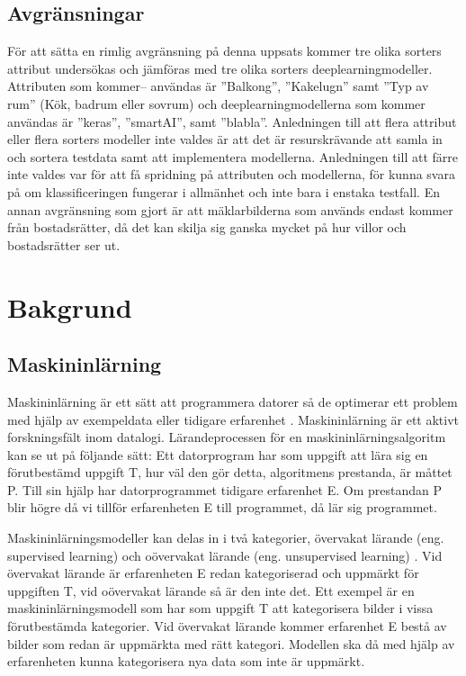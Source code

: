 \documentclass[]{kththesis}
\begin{document}
\section{Avgränsningar}
För att sätta en rimlig avgränsning på denna uppsats kommer tre olika sorters attribut undersökas och jämföras med tre olika sorters deeplearningmodeller. 
Attributen som kommer– användas är ”Balkong”, ”Kakelugn” samt ”Typ av rum” (Kök, badrum eller sovrum) och deeplearningmodellerna som kommer användas är ”keras”, ”smartAI”, samt ”blabla”. 
Anledningen till att flera attribut eller flera sorters modeller inte valdes är att det är resurskrävande att samla in och sortera testdata samt att implementera modellerna. 
Anledningen till att färre inte valdes var för att få spridning på attributen och modellerna, för kunna svara på om klassificeringen fungerar i allmänhet och inte bara i enstaka testfall. 
En annan avgränsning som gjort är att mäklarbilderna som används endast kommer från bostadsrätter, då det kan skilja sig ganska mycket på hur villor och bostadsrätter ser ut.

\chapter{Bakgrund}

\section{Maskininlärning}
Maskininlärning är ett sätt att programmera datorer så de optimerar ett problem med hjälp av exempeldata eller tidigare erfarenhet \parencite{alpaydin2009introduction}. Maskininlärning är ett aktivt forskningsfält inom datalogi. Lärandeprocessen för en maskininlärningsalgoritm kan se ut på följande sätt: Ett datorprogram har som uppgift att lära sig en förutbestämd uppgift T, hur väl den gör detta, algoritmens prestanda, är måttet P. Till sin hjälp har datorprogrammet tidigare erfarenhet E. Om prestandan P blir högre då vi tillför erfarenheten E till programmet, då lär sig programmet.

Maskininlärningsmodeller kan delas in i två kategorier, övervakat lärande (eng. supervised learning) och oövervakat lärande (eng. unsupervised learning) \parencite{murphy2012machine}. Vid övervakat lärande är erfarenheten E redan kategoriserad och uppmärkt för uppgiften T, vid oövervakat lärande så är den inte det. Ett exempel är en maskininlärningsmodell som har som uppgift T att kategorisera bilder i vissa förutbestämda kategorier. Vid övervakat lärande kommer erfarenhet E bestå av bilder som redan är uppmärkta med rätt kategori. Modellen ska då med hjälp av erfarenheten kunna kategorisera nya data som inte är uppmärkt. 
\end{document}
